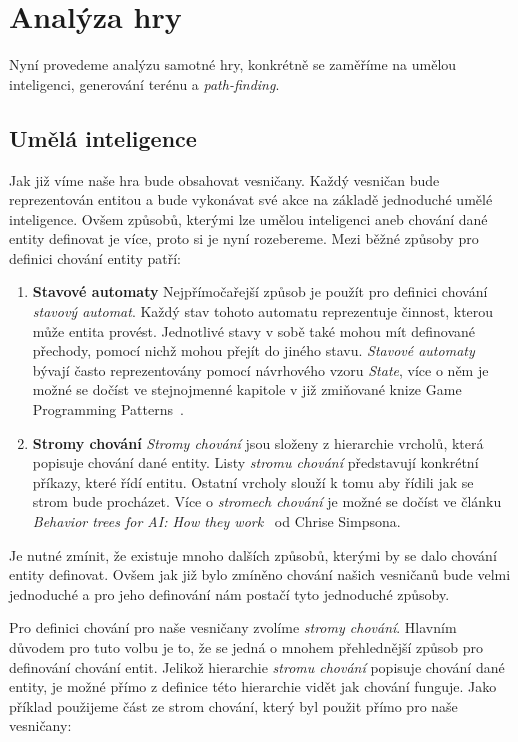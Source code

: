 \section{Analýza hry}
Nyní provedeme analýzu samotné hry, konkrétně se zaměříme na umělou inteligenci, generování terénu a \textit{path-finding}.

\subsection{Umělá inteligence}
Jak již víme naše hra bude obsahovat vesničany. Každý vesničan bude reprezentován entitou a bude vykonávat své akce na základě jednoduché umělé inteligence. Ovšem způsobů, kterými lze umělou inteligenci aneb chování dané entity definovat je více, proto si je nyní rozebereme. Mezi běžné způsoby pro definici chování entity patří:

\begin{enumerate}
    \item \textbf{Stavové automaty} Nejpřímočařejší způsob je použít pro definici chování \textit{stavový automat}. Každý stav tohoto automatu reprezentuje činnost, kterou může entita provést. Jednotlivé stavy v sobě také mohou mít definované přechody, pomocí nichž mohou přejít do jiného stavu. \textit{Stavové automaty} bývají často reprezentovány pomocí návrhového vzoru \textit{State}, více o něm je možné se dočíst ve stejnojmenné kapitole v již zmiňované knize Game Programming Patterns~\cite{nystrom2014game}.
    
    \item \textbf{Stromy chování} \textit{Stromy chování} jsou složeny z hierarchie vrcholů, která popisuje chování dané entity. Listy \textit{stromu chování} představují konkrétní příkazy, které řídí entitu. Ostatní vrcholy slouží k tomu aby řídili jak se strom bude procházet. Více o \textit{stromech chování} je možné se dočíst ve článku \textit{Behavior trees for AI: How they work}~\cite{BehaviorTrees} od Chrise Simpsona.
\end{enumerate}

Je nutné zmínit, že existuje mnoho dalších způsobů, kterými by se dalo chování entity definovat. Ovšem jak již bylo zmíněno chování našich vesničanů bude velmi jednoduché a pro jeho definování nám postačí tyto jednoduché způsoby.

Pro definici chování pro naše vesničany zvolíme \textit{stromy chování}. Hlavním důvodem pro tuto volbu je to, že se jedná o mnohem přehlednější způsob pro definování chování entit. Jelikož hierarchie \textit{stromu chování} popisuje chování dané entity, je možné přímo z definice této hierarchie vidět jak chování funguje. Jako příklad použijeme část ze strom chování, který byl použit přímo pro naše vesničany:

